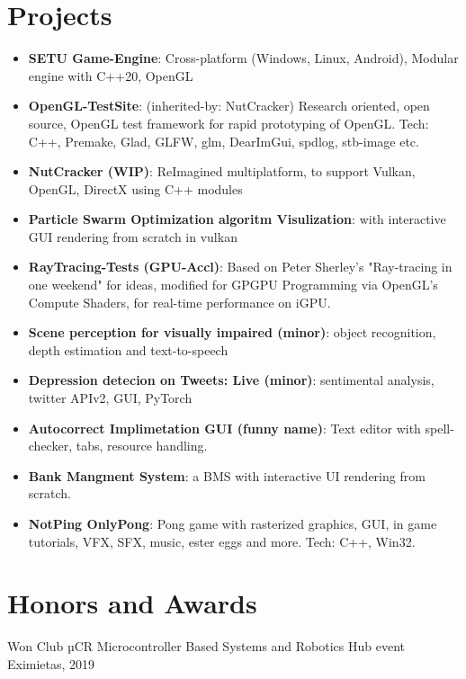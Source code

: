 \documentclass[a4paper,10pt]{article}
\newcommand{\resumeItem}[2]{
  \item\small{
    \textbf{#1}{: #2 \vspace{-2pt}}
  }
}
\newcommand{\resumeSubItem}[2]{\resumeItem{#1}{#2}\vspace{-3pt}}
\newcommand{\resumeSubHeadingListStart}{\begin{itemize}[leftmargin=*]}
\newcommand{\resumeSubHeadingListEnd}{\end{itemize}}
\begin{document}
\section{Projects}
  \resumeSubHeadingListStart
  \resumeSubItem{SETU Game-Engine}{Cross-platform (Windows, Linux, Android), Modular engine with C++20, OpenGL}\hspace{15pt}{(2nd half '22)}
  \resumeSubItem{OpenGL-TestSite}{(inherited-by: NutCracker) Research oriented, open source, OpenGL test framework for rapid prototyping of OpenGL. Tech: C++, Premake, Glad, GLFW, glm, DearImGui, spdlog, stb-image etc. }\hspace{25pt}{(May-Oct '21)}
    \resumeSubItem{NutCracker (WIP)}{ReImagined multiplatform, to support Vulkan, OpenGL, DirectX using C++ modules}{(May-`Till '22)}
    \resumeSubItem{Particle Swarm Optimization algoritm Visulization}{with interactive GUI rendering from scratch in vulkan}{(May '22)}
    \resumeSubItem{RayTracing-Tests (GPU-Accl)}{Based on Peter Sherley’s "Ray-tracing in one weekend" for ideas, modified for GPGPU Programming via OpenGL's Compute Shaders, for real-time performance on iGPU.}\hspace{107pt}{(Jun-Aug '21)}
    \resumeSubItem{Scene perception for visually impaired (minor)}{object recognition, depth estimation and text-to-speech}\hspace{16pt}{(Apr '22)}
    \resumeSubItem{Depression detecion on Tweets: Live (minor)}{sentimental analysis, twitter APIv2, GUI, PyTorch}\hspace{42pt}{(Nov '21)}
    \resumeSubItem{Autocorrect Implimetation GUI (funny name)}{Text editor with spell-checker, tabs, resource handling.}\hspace{-3pt}{(May-Aug '21)}
    \resumeSubItem{Bank Mangment System}{a BMS with interactive UI rendering from scratch.}\hspace{135pt}{(May '20)}
    \resumeSubItem{NotPing OnlyPong}{Pong game with rasterized graphics, GUI, in game tutorials, VFX, SFX, music, ester eggs and more. Tech: C++, Win32.}\hspace{382pt}{(Nov '20)}
  \resumeSubHeadingListEnd
\vspace{-5pt}
\section{Honors and Awards}
\begin{description}[font=$\bullet$]
\item {Won Club µCR Microcontroller Based Systems and Robotics Hub event Eximietas, 2019 }
\end{description}
\vspace{-6pt}
\end{document}
